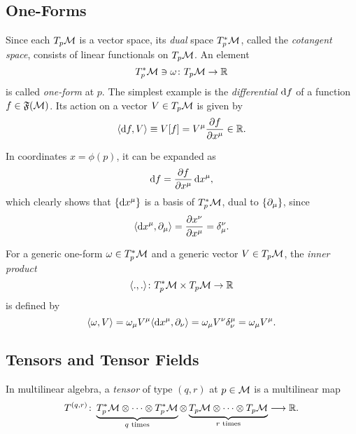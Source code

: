 \subsection{One-Forms}
Since each $T_p \mathcal{M}$ is a vector space, its \emph{dual} space $T^*_p \mathcal{M}$, called the \emph{cotangent space}, consists of linear functionals on $T_p \mathcal{M}$. An element 
\begin{equation}
    T^*_p \mathcal{M} \ni \omega \colon T_p \mathcal{M} \to \mathbb{R}
\end{equation}
is called \emph{one-form} at $p$. The simplest example is the \emph{differential} $\mathop{}\!\mathrm{d} f$ of a function $f \in \mathfrak{F}(\mathcal{M})$. Its action on a vector $V \in T_p \mathcal{M}$ is given by
\begin{equation}
	\langle \mathop{}\!\mathrm{d} f, V \rangle \equiv V[f] = V^\mu \frac{\partial f}{\partial x^\mu} \in \mathbb{R}.
\end{equation}

In coordinates $x = \phi(p)$, it can be expanded as
\begin{equation}
	\mathop{}\!\mathrm{d} f = \frac{\partial f}{\partial x^\mu} \mathop{}\!\mathrm{d} x^\mu,
\end{equation}
which clearly shows that $\{ \mathop{}\!\mathrm{d} x^\mu \}$ is a basis of $T^*_p \mathcal{M}$, dual to $\{ \partial_\mu \}$, since
\begin{equation}
	\langle \mathop{}\!\mathrm{d} x^\mu, \partial_\mu \rangle = \frac{\partial x^\nu}{\partial x^\mu} = \delta^\nu_\mu .
\end{equation}

For a generic one-form $\omega \in T^*_p \mathcal{M}$ and a generic vector $V \in T_p \mathcal{M}$, the \emph{inner product}
\begin{equation}
    \langle ., . \rangle\colon T^*_p \mathcal{M} \times T_p \mathcal{M} \to \mathbb{R}
\end{equation}
is defined by
\begin{equation}\label{eq:def-inner-product-vector-one-form}
	\langle \omega, V \rangle = \omega_\mu V^\mu \langle \mathop{}\!\mathrm{d} x^\mu, \partial_\nu \rangle = \omega_\mu V^\nu \delta^\mu_\nu = \omega_\mu V^\mu.
\end{equation}

\subsection{Tensors and Tensor Fields}
In multilinear algebra, a \emph{tensor} of type $(q,r)$ at $p \in \mathcal{M}$ is a multilinear map 
\begin{equation}
	T^{(q,r)} \colon
	\underbrace{T^*_p \mathcal{M} \otimes \dots \otimes T^*_p \mathcal{M}}_\text{$q$ times}
	\otimes
	\underbrace{T_p \mathcal{M} \otimes \dots \otimes T_p \mathcal{M}}_\text{$r$ times} \longrightarrow \mathbb{R}.
\end{equation}

